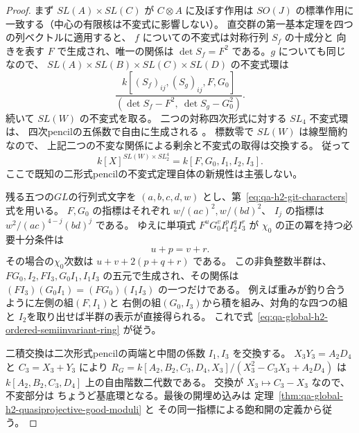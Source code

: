 \begin{proof}
まず $SL(A)\times SL(C)$ が $C\otimes A$ に及ぼす作用は
$SO(J)$ の標準作用に一致する（中心の有限核は不変式に影響しない）。
直交群の第一基本定理を四つの列ベクトルに適用すると、
$f$ についての不変式は対称行列 $S_f$ の十成分と
向きを表す $F$ で生成され、唯一の関係は
$\det S_f=F^2$ である。$g$ についても同じなので、
$SL(A)\times SL(B)\times SL(C)\times SL(D)$ の不変式環は
\[
 \frac{k[(S_f)_{ij},(S_g)_{ij},F,G_0]}
 {(\det S_f-F^2,\ \det S_g-G_0^2)}.
\]
続いて $SL(W)$ の不変式を取る。
二つの対称四次形式に対する $SL_4$ 不変式環は、
四次pencilの五係数で自由に生成される
\cite[\S4.2]{BhargavaGrossWang2015}。
標数零で $SL(W)$ は線型簡約なので、
上記二つの不変な関係による剰余と不変式の取得は交換する。
従って
\[
 k[X]^{SL(W)\times SL_2^4}
 =k[F,G_0,I_1,I_2,I_3].
 \tag{P0}\label{eq:qa-global-h2-five-pencil-invariants}
\]
ここで既知の二形式pencilの不変式定理自体の新規性は主張しない。

残る五つの$GL$の行列式文字を
$(a,b,c,d,w)$ とし、第~\eqref{eq:qa-h2-git-characters}式を用いる。
$F,G_0$ の指標はそれぞれ $w/(ac)^2,w/(bd)^2$、
$I_j$ の指標は $w^2/(ac)^{4-j}(bd)^j$ である。
ゆえに単項式 $F^uG_0^vI_1^pI_2^qI_3^r$ が
$\chi_0$ の正の冪を持つ必要十分条件は
\[
 u+p=v+r.
 \tag{bal}\label{eq:qa-global-h2-balanced-exponents}
\]
その場合の$\chi_0$次数は $u+v+2(p+q+r)$ である。
この非負整数半群は、$FG_0,I_2,FI_3,G_0I_1,I_1I_3$
の五元で生成され、その関係は
$(FI_3)(G_0I_1)=(FG_0)(I_1I_3)$ の一つだけである。
例えば重みが釣り合うように左側の組$(F,I_1)$と
右側の組$(G_0,I_3)$から積を組み、対角的な四つの組と
$I_2$を取り出せば半群の表示が直接得られる。
これで式~\eqref{eq:qa-global-h2-ordered-semiinvariant-ring} が従う。

二積交換は二次形式pencilの両端と中間の係数
$I_1,I_3$ を交換する。
$X_3Y_3=A_2D_4$ と $C_3=X_3+Y_3$ により
$R_G=k[A_2,B_2,C_3,D_4,X_3]/(X_3^2-C_3X_3+A_2D_4)$
は $k[A_2,B_2,C_3,D_4]$ 上の自由階数二代数である。
交換が $X_3\mapsto C_3-X_3$ なので、不変部分は
ちょうど基底環となる。最後の開埋め込みは
定理~\ref{thm:qa-global-h2-quasiprojective-good-moduli} と
その同一指標による飽和開の定義から従う。
\end{proof}

